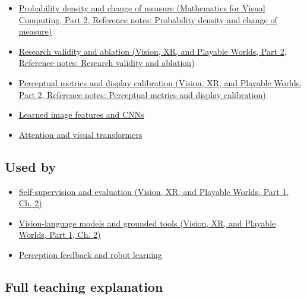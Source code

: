 \hypertarget{appendix-772f1fd96148-prerequisites}{}

\begin{itemize}
\tightlist
\item
  \href{../02-Mathematics-for-Visual-Computing-P02/main.pdf\#nameddest=appendix-4815cd87ab8b}{Probability density and change of measure (Mathematics for Visual Computing, Part 2, Reference notes: Probability density and change of measure)}
\item
  \href{../07-Vision-XR-and-Playable-Worlds-P02/main.pdf\#nameddest=appendix-65788587ef78}{Research validity and ablation (Vision, XR, and Playable Worlds, Part 2, Reference notes: Research validity and ablation)}
\item
  \href{../07-Vision-XR-and-Playable-Worlds-P02/main.pdf\#nameddest=appendix-b2c1846508bf}{Perceptual metrics and display calibration (Vision, XR, and Playable Worlds, Part 2, Reference notes: Perceptual metrics and display calibration)}
\item
  \hyperref[appendix-47c51ea026fb]{Learned image features and CNNs}
\item
  \hyperref[appendix-a9d5dfdd164a]{Attention and visual transformers}
\end{itemize}

\subsection{Used by}\label{appendix-772f1fd96148-used-by}

\hypertarget{appendix-772f1fd96148-used-by}{}

\begin{itemize}
\tightlist
\item
  \href{../07-Vision-XR-and-Playable-Worlds-P01/main.pdf\#nameddest=04-visual-computing-ii-ch031-self-supervision-and-evaluation}{Self-supervision and evaluation (Vision, XR, and Playable Worlds, Part 1, Ch. 2)}
\item
  \href{../07-Vision-XR-and-Playable-Worlds-P01/main.pdf\#nameddest=04-visual-computing-ii-ch031-vision-language-models-and-grounded-tools}{Vision-language models and grounded tools (Vision, XR, and Playable Worlds, Part 1, Ch. 2)}
\item
  \hyperref[appendix-b0c42da325f1]{Perception feedback and robot learning}
\end{itemize}

\subsection{Full teaching explanation}\label{appendix-772f1fd96148-full-teaching-explanation}

